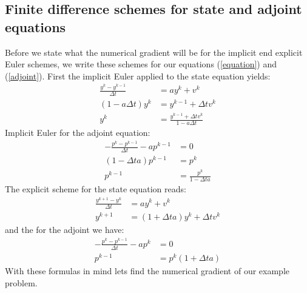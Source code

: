 \subsection{Finite difference schemes for state and adjoint equations}
Before we state what the numerical gradient will be for the implicit end explicit Euler schemes, we write these schemes for our equations (\ref{equation}) and (\ref{adjoint}). First the implicit Euler applied to the state equation yields:
\begin{align}
\frac{y^k-y^{k-1}}{\Delta t} &= a y^{k} + v^{k} \\
(1-a\Delta t)y^{k} &= y^{k-1} +\Delta t v^{k} \\
y^k &=\frac{y^{k-1} +\Delta t v^{k}}{1-a\Delta t} \label{I_state}
\end{align}
Implicit Euler for the adjoint equation:
\begin{align}
-\frac{p^k-p^{k-1}}{\Delta t} -a p^{k-1} &=0 \\
(1-\Delta ta)p^{k-1}&=p^k \\
p^{k-1} &= \frac{p^k}{1-\Delta ta} \label{I_adjoint}
\end{align}
The explicit scheme for the state equation reads:
\begin{align}
\frac{y^{k+1}-y^{k}}{\Delta t} &= a y^{k} + v^{k} \\
y^{k+1}&=(1 +\Delta ta) y^{k} + \Delta t v^{k}\label{E_state}
\end{align} 
and the for the adjoint we have:
\begin{align}
-\frac{p^k-p^{k-1}}{\Delta t} -a p^{k} &=0 \\
p^{k-1} &=p^k(1 +\Delta ta)\label{E_adjoint}
\end{align}
With these formulas in mind lets find the numerical gradient of our example problem.
